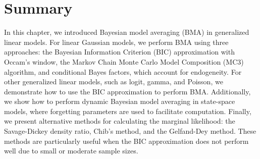     

\section{Summary}\label{sec10_5}
In this chapter, we introduced Bayesian model averaging (BMA) in generalized linear models. For linear Gaussian models, we perform BMA using three approaches: the Bayesian Information Criterion (BIC) approximation with Occam's window, the Markov Chain Monte Carlo Model Composition (MC3) algorithm, and conditional Bayes factors, which account for endogeneity. For other generalized linear models, such as logit, gamma, and Poisson, we demonstrate how to use the BIC approximation to perform BMA. Additionally, we show how to perform dynamic Bayesian model averaging in state-space models, where forgetting parameters are used to facilitate computation. Finally, we present alternative methods for calculating the marginal likelihood: the Savage-Dickey density ratio, Chib's method, and the Gelfand-Dey method. These methods are particularly useful when the BIC approximation does not perform well due to small or moderate sample sizes.

